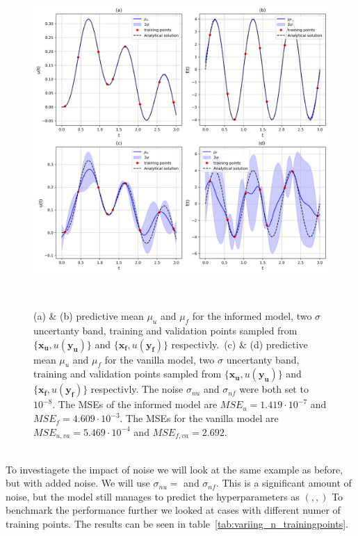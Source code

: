 \documentclass{article}
\begin{document}
\begin{figure}[htbp!]
    \centering
    \includegraphics[width=1\textwidth]{../final_examples/oscillator/merged_1d_plots.png}
    \caption{(a) \& (b) predictive mean $\mu_u$ and $\mu_f$ for the informed model, two $\sigma$ uncertanty band, training and validation points sampled from $\{\bm{x_u},u(\bm{y_u})\}$ and $\{\bm{x_f},u(\bm{y_f})\}$ respectivly.\ (c) \& (d) predictive mean $\mu_u$ and $\mu_f$ for the vanilla model, two $\sigma$ uncertanty band, training and validation points sampled from $\{\bm{x_u},u(\bm{y_u})\}$ and $\{\bm{x_f},u(\bm{y_f})\}$ respectivly. The noise $\sigma_{nu}$ and $\sigma_{nf}$ were both set to $10^{-8}$. The MSEs of the informed model are $MSE_u = 1.419 \cdot 10^{-7}$ and $MSE_f = 4.609 \cdot 10^{-3}$. The MSEs for the vanilla model are $MSE_{u,va} = 5.469 \cdot 10^{-4}$ and $MSE_{f,va} = 2.692$.}
    ~\label{fig:damped_oscillator}
\end{figure}
\\
To investiagete the impact of noise we will look at the same example as before, but with added noise. We will use $\sigma_{nu} = $ and $\sigma_{nf}$. This is a significant amount of noise, but the model still manages to predict the hyperparameters as $(,,)$
To benchmark the performance further we looked at cases with different numer of training points. The results can be seen in table~\ref{tab:variing_n_trainingpoints}.
\end{document}
